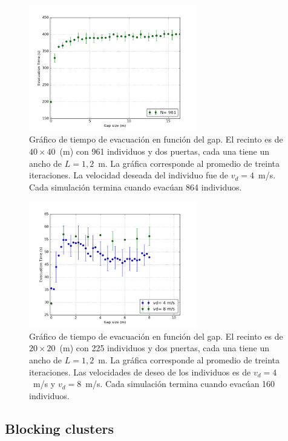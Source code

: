 \begin{figure}[H]
    \centering
    \includegraphics[height=5.5cm]{figuras/gap_vste_v4_961p.png}
    \caption[width=5cm]{Gráfico de tiempo de evacuación en función del gap. El recinto es de $40\times 40$~(m) con 961 individuos y dos puertas, cada una tiene un ancho de $L=1,2$~m. La gráfica corresponde al promedio de treinta iteraciones. La velocidad deseada del individuo fue de $v_d=4$~m/s. Cada simulación termina cuando evacúan 864 individuos.}
    \label{sintesis}
\end{figure}

\begin{figure}[H]
    \centering
    \includegraphics[height=5.5cm]{figuras/gap_vste_v4_v8.png}
    \caption[width=5cm]{Gráfico de tiempo de evacuación en función del gap. El recinto es de $20\times 20$~(m) con 225 individuos y dos puertas, cada una tiene un ancho de $L=1,2$~m. La gráfica corresponde al promedio de treinta iteraciones. Las velocidades de deseo de los individuos es de $v_d=4$~m/s y $v_d=8$~m/s. Cada simulación termina cuando evacúan 160 individuos.}
    \label{sintesis}
\end{figure}




\subsection{Blocking clusters}

